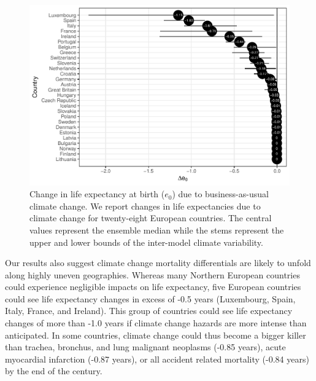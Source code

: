 \documentclass[12pt,]{article}
\makeatletter
\def\maxwidth{\ifdim\Gin@nat@width>\linewidth\linewidth
\else\Gin@nat@width\fi}
\let\Oldincludegraphics\includegraphics
\renewcommand{\includegraphics}[1]{\Oldincludegraphics[width=\maxwidth]{#1}}
\makeatother
\begin{document}
\begin{figure}
\centering
\includegraphics{MS-cclifeexpec_files/figure-latex/unnamed-chunk-2-1.pdf}
\caption{Change in life expectancy at birth (\(e_0\)) due to
business-as-usual climate change. We report changes in life expectancies
due to climate change for twenty-eight European countries. The central
values represent the ensemble median while the stems represent the upper
and lower bounds of the inter-model climate variability.}
\end{figure}

Our results also suggest climate change mortality differentials are
likely to unfold along highly uneven geographies. Whereas many Northern
European countries could experience negligible impacts on life
expectancy, five European countries could see life expectancy changes in
excess of -0.5 years (Luxembourg, Spain, Italy, France, and Ireland).
This group of countries could see life expectancy changes of more than
-1.0 years if climate change hazards are more intense than anticipated.
In some countries, climate change could thus become a bigger killer than
trachea, bronchus, and lung malignant neoplasms (-0.85 years), acute
myocardial infarction (-0.87 years), or all accident related mortality
(-0.84 years) \citep{arias2013united} by the end of the century.
\end{document}
